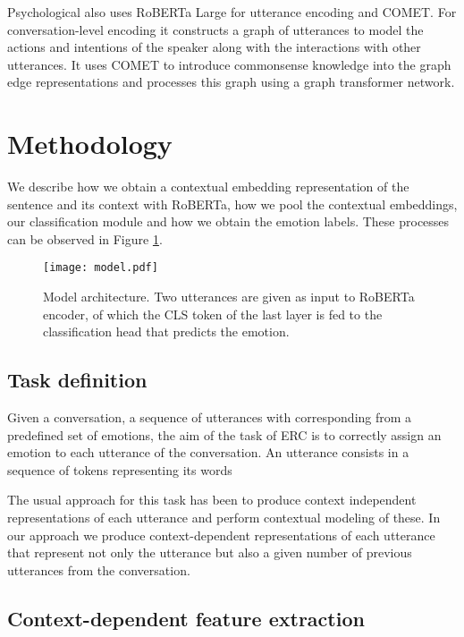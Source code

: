\documentclass[11pt]{article}
\begin{document}
Psychological \cite{li-etal-2021-past-present} also uses RoBERTa Large for utterance encoding and COMET. For conversation-level encoding it constructs a graph of utterances to model the actions and  intentions of the speaker along with the interactions with other utterances. It uses COMET to introduce commonsense knowledge into the graph edge representations and processes this graph using a graph transformer network.



\section{Methodology}

We describe how we obtain a contextual embedding representation of the sentence and its context with RoBERTa, how we pool the contextual embeddings, our classification module and how we obtain the emotion labels. These processes can be observed in Figure \ref{f1}.

\begin{figure}[!ht]
\begin{center}
  \texttt{[image: model.pdf]}
  
 \end{center}
  \caption{Model architecture. Two utterances are given as input to RoBERTa encoder, of which the CLS token of the last layer is fed to the classification head that predicts the emotion.
}
  \label{f1}
  \end{figure}

\subsection{Task definition}

Given a conversation, a sequence of  utterances with corresponding  from a predefined set of emotions, the aim of the task of ERC is to correctly assign an emotion to each utterance of the conversation.  An utterance consists in a sequence of  tokens representing its  words 



The usual approach for this task has been to produce context independent representations of each utterance and perform contextual modeling of these. 
In our approach we produce context-dependent representations of each utterance that represent not only the utterance but also a given number of previous utterances from the conversation.

\subsection{Context-dependent feature extraction}
\end{document}
